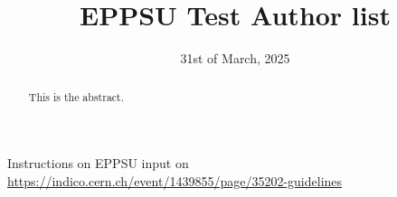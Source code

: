 \documentclass{article}
\title{EPPSU Test Author list}
\date{31st of March, 2025}
\begin{document}

\begin{minipage}{\textwidth}
\maketitle
\begin{abstract}
This is the abstract.
\end{abstract}

Instructions on EPPSU input on \href{https://indico.cern.ch/event/1439855/page/35202-guidelines}{https://indico.cern.ch/event/1439855/page/35202-guidelines}
\end{minipage}
\newpage


\newpage


\newpage

\appendix



% 
% 
% 
% 
% 



\end{document}
